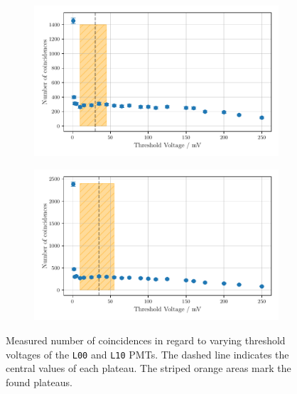 \begin{figure}
    \centering
    \begin{subfigure}[b]{0.48\textwidth}
        \includegraphics[width=\textwidth]{plots/threshL00.pdf}
    \end{subfigure}\hfill
    \begin{subfigure}[b]{0.48\textwidth}
        \includegraphics[width=\textwidth]{plots/threshL10.pdf}
    \end{subfigure}
    \caption{Measured number of coincidences in regard to varying threshold voltages
    of the \texttt{L00} and \texttt{L10} PMTs.
    The dashed line indicates the central values of each plateau. The striped orange areas mark the found plateaus.}
    \label{fig:appthresh3}
\end{figure}
